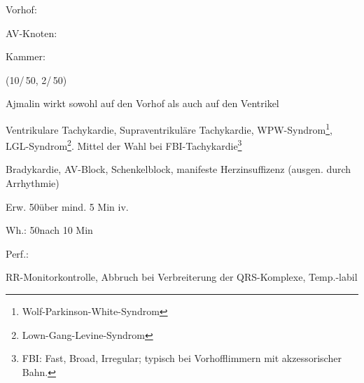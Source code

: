 Vorhof:

AV-Knoten:

Kammer:


%


{
\begin{MedikamentCharakteristika}
  \item[{\TxItemSpezialitaeten}]  
  (10\Ml*/\,50\Mg, 2\Ml*/\,50\Mg*)
  \item[{\TxItemBeschreibung}] Ajmalin wirkt sowohl auf den Vorhof als auch auf den Ventrikel
  \item[{\TxItemIndikation}]
  Ventrikulare Tachykardie, 
  Supraventrikuläre Tachykardie,
  WPW-Syndrom\footnote{Wolf-Parkinson-White-Syndrom},
  LGL-Syndrom\footnote{Lown-Gang-Levine-Syndrom}.
  Mittel der Wahl bei FBI-Tachykardie\footnote{FBI: Fast, Broad, Irregular; typisch bei Vorhofflimmern mit akzessorischer Bahn.}
  \item[{\TxItemKontraindikation}]  Bradykardie, AV-Block, 
  Schenkelblock, manifeste Herzinsuffizenz
  (ausgen. durch Arrhythmie)
  \item[{\TxItemDosierung}] Erw. 50\Mg* über mind. 5 Min iv.

  Wh.: 50\Mg* nach 10 Min

  Perf.: \MgKgH
  
  RR-Monitorkontrolle, Abbruch bei Verbreiterung der QRS-Komplexe,
  Temp.-labil
\end{MedikamentCharakteristika}}
{}




